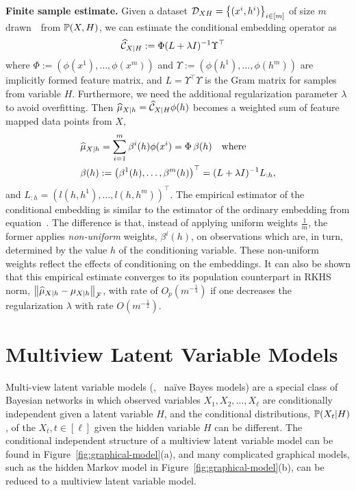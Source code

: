 \documentclass[11pt]{article}
\newcommand{\hmu}{\widehat{\mu}}
\begin{document}
{\bf Finite sample estimate.} Given a dataset $\mathcal{D}_{XH}=\left\{(x^i,h^i)\right\}_{i\in[m]}$ of size $m$ drawn~\iid~from $\mathbb{P}(X,H)$, we can estimate the conditional embedding operator as
\begin{align}
    & \widehat{\mathcal{C}}_{X|H} := \Phi (L + \lambda I)^{-1} \Upsilon^\top  \label{eq:embeddingoperatorestimator}
\end{align}
where $\Phi:=(\phi(x^1),\ldots,\phi(x^m))$ and $\Upsilon:=(\phi(h^1),\ldots,\phi(h^m))$ are implicitly formed feature matrix, and $L=\Upsilon^\top \Upsilon$ is the Gram matrix for samples from variable $H$. Furthermore, we need the additional regularization parameter $\lambda$ to avoid overfitting. Then $\hmu_{X|h}=\widehat{\Ccal}_{X|H}\phi(h)$ becomes a weighted sum of feature mapped data points from $X$,
\begin{align}
    & \hmu_{X|h} = \sum_{i=1}^m \beta^i(h) \phi(x^i) = \Phi\, \beta(h) \quad \text{where} \,  \label{eq:conditionalembeddingestimator}\\
    & \beta(h) := \rbr{\beta^1(h), \ldots, \beta^m(h)}^\top = (L + \lambda I)^{-1} L_{: h}, \nonumber
\end{align}
and $L_{: h}=(l(h,h^1),\ldots,l(h,h^m))^\top$.
The empirical estimator of the conditional embedding
is similar to the estimator of the ordinary embedding from
equation~. The difference
is that, instead of applying uniform weights $\frac{1}{m}$,
the former applies {\em non-uniform} weights, $\beta^i(h)$, on
observations which are, in turn, determined by the value $h$ of the conditioning
variable. These non-uniform weights reflect the effects of
conditioning on the embeddings. It can also be shown that this empirical estimate converges to its population counterpart in RKHS norm, $\nbr{\hmu_{X|h} - \mu_{X|h}}_{\Fcal}$, with rate of $O_p(m^{-\frac{1}{4}})$ if one decreases the regularization $\lambda$ with rate $O(m^{-\frac{1}{2}})$.

\section{Multiview Latent Variable Models}

Multi-view latent variable models (\eg, \, na\"ive Bayes models) are a
special class of Bayesian networks in which observed variables $X_1, X_2,
\ldots, X_\ell$ are conditionally independent given a latent variable $H$, and
the conditional distributions, $\mathbb{P}(X_t|H)$, of the $X_t, t \in [\ell]$ given the hidden variable $H$ can be different. The conditional independent structure of a multiview latent variable model can be found in Figure~\ref{fig:graphical-model}(a), and many complicated graphical models, such as the hidden Markov model in Figure~\ref{fig:graphical-model}(b), can be reduced to a multiview latent variable model.
\end{document}
